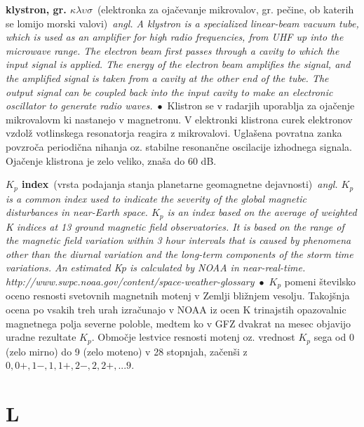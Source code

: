 \documentclass[10pt,a4paper,twoside]{article} %
\newcommand{\entry}[4]{\markboth{#1}{#1}\textbf{#1}\ {(#2)}\ \textit{#3}\ $\bullet$\ {#4}}  %
\begin{document}
\begin{multicols}{2}
	
	\entry{klystron, gr. $\kappa \lambda \upsilon \sigma$}{elektronka za ojačevanje mikrovalov, gr. pečine, ob katerih se lomijo morski valovi}{angl. A klystron is a specialized linear-beam vacuum tube, which is used as an amplifier for high radio frequencies, from UHF up into the microwave range. The electron beam first passes through a cavity to which the input signal is applied. The energy of the electron beam amplifies the signal, and the amplified signal is taken from a cavity at the other end of the tube. The output signal can be coupled back into the input cavity to make an electronic oscillator to generate radio waves.}{Klistron se v radarjih uporablja za ojačenje mikrovalovm ki nastanejo v magnetronu. V elektronki klistrona curek elektronov vzdolž votlinskega resonatorja reagira z mikrovalovi. Uglašena povratna zanka povzroča periodična nihanja oz. stabilne resonančne oscilacije izhodnega signala. Ojačenje klistrona je zelo veliko, znaša do 60 dB.}
	
	
	\entry{$ K_p $ index}{vrsta podajanja stanja planetarne geomagnetne dejavnosti}{angl. $ K_p $ is a common index used to indicate the severity of the global magnetic disturbances in near-Earth space. $ K_p $ is an index based on the average of weighted K indices at 13 ground magnetic field observatories. It is based on the range of the magnetic field variation within 3 hour intervals that is caused by phenomena other than the diurnal variation and the long-term components of the storm time variations. An estimated Kp is calculated by NOAA in near-real-time. {\scriptsize http://www.swpc.noaa.gov/content/space-weather-glossary}}{$ K_p $ pomeni številsko oceno resnosti svetovnih magnetnih motenj v Zemlji bližnjem vesolju. Takojšnja ocena po vsakih treh urah izračunajo v NOAA iz ocen K trinajstih opazovalnic magnetnega polja severne poloble, medtem ko v GFZ dvakrat na mesec objavijo uradne rezultate $ K_p $. Območje lestvice resnosti motenj oz. vrednost $ K_p $ sega od 0 (zelo mirno) do 9 (zelo moteno) v 28 stopnjah, začenši z $ 0, 0+, 1-, 1, 1+, 2-, 2, 2+,...9$.}
	
\end{multicols}	



\section*{L}
\end{document}
